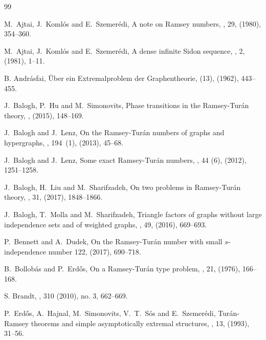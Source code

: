 \documentclass[11pt, a4paper]{article}
\theoremstyle{definition}
\begin{document}
%
\begin{thebibliography}{99}
	\setlength{\parskip}{0pt}
	\setlength{\itemsep}{0pt plus 0.3ex}
	\small

M.~Ajtai, J.~Koml\'os and E.~Szemer\'edi,
\newblock A note on Ramsey numbers,
, 29, (1980), 354--360.

M.~Ajtai, J.~Koml\'os and E.~Szemer\'edi,
\newblock A dense infinite Sidon sequence,
, 2, (1981), 1--11.

B. Andr\'asfai,
\newblock \"Uber ein Extremalproblem der Graphentheorie,
 (13), (1962), 443--455.

J.~Balogh, P.~Hu and M.~Simonovits,
\newblock Phase transitions in the Ramsey-Tur\'an theory,
, (2015), 148--169. 

J.~Balogh and J.~Lenz,
\newblock On the {R}amsey-{T}ur\'an numbers of graphs and hypergraphs,
, 194~(1), (2013), 45--68.

J.~Balogh and J.~Lenz,
\newblock Some exact {R}amsey-{T}ur\'an numbers,
, 44 (6), (2012), 1251--1258.

J.~Balogh, H.~Liu and M.~Sharifzadeh,
\newblock On two problems in Ramsey-Tur\'an theory,
, 31, (2017), 1848--1866.

J.~Balogh, T.~Molla and M.~Sharifzadeh,
\newblock Triangle factors of graphs without large independence sets and of weighted graphs,
, 49, (2016), 669--693.

P.~Bennett and A.~Dudek,
\newblock On the Ramsey-Tur\'an number with small $s$-independence number
 122, (2017), 690--718.

B.~Bollob\'as and P.~Erd\H os,
\newblock On a Ramsey-Tur\'an type problem,
, 21, (1976), 166--168.

S. Brandt,
, 
 310 (2010), no. 3, 662--669.

P.~Erd\H os, A.~Hajnal, M.~Simonovits, V.~T.~S\'os and E.~Szemer\'edi,
\newblock Tur\'an-Ramsey theorems and simple asymptotically extremal structures,
, 13, (1993), 31--56.


\end{thebibliography}
\end{document}
